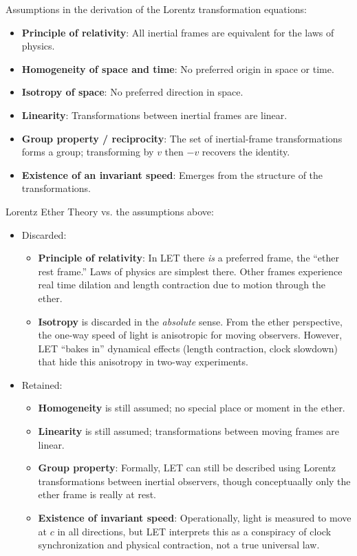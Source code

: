 \documentclass[a4paper]{article}
\theoremstyle{plain}
\theoremstyle{definition}
\begin{document}
Assumptions in the derivation of the Lorentz transformation equations:
\begin{itemize}
\item \textbf{Principle of relativity}: All inertial frames are
  equivalent for the laws of physics.
\item \textbf{Homogeneity of space and time}: No preferred origin in
  space or time.
\item \textbf{Isotropy of space}: No preferred direction in space.
\item \textbf{Linearity}: Transformations between inertial frames are
  linear.
\item \textbf{Group property / reciprocity}: The set of inertial-frame
  transformations forms a group; transforming by $v$ then $-v$
  recovers the identity.
\item \textbf{Existence of an invariant speed}: Emerges from the
  structure of the transformations.
\end{itemize}

Lorentz Ether Theory vs. the assumptions above:
\begin{itemize}
\item Discarded:
  \begin{itemize}
  \item \textbf{Principle of relativity}: In LET there {\em is} a
    preferred frame, the ``ether rest frame.''  Laws of physics are
    simplest there.  Other frames experience real time dilation and
    length contraction due to motion through the ether.
  \item \textbf{Isotropy} is discarded in the {\em absolute} sense.
    From the ether perspective, the one-way speed of light is
    anisotropic for moving observers.  However, LET ``bakes in''
    dynamical effects (length contraction, clock slowdown) that hide
    this anisotropy in two-way experiments.
  \end{itemize}
\item Retained:
  \begin{itemize}
  \item \textbf{Homogeneity} is still assumed; no special place or
    moment in the ether.
  \item \textbf{Linearity} is still assumed; transformations between
    moving frames are linear.
  \item \textbf{Group property}: Formally, LET can still be described
    using Lorentz transformations between inertial observers, though
    conceptuaally only the ether frame is really at rest.
  \item \textbf{Existence of invariant speed}: Operationally, light is
    measured to move at $c$ in all directions, but LET interprets this
    as a conspiracy of clock synchronization and physical contraction,
    not a true universal law.
  \end{itemize}
\end{itemize}
\end{document}
